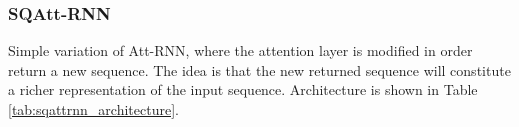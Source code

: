 \begin{table}[h!]
	\caption{Att-RNN architecture}
	\label{tab:attrnn_architecture}
\end{table}

\subsubsection{\textbf{SQAtt-RNN}}
Simple variation of Att-RNN, where the attention layer is modified in order return a new sequence. The idea is that the new returned sequence will constitute a richer representation of the input sequence. Architecture is shown in Table \ref{tab:sqattrnn_architecture}.

\begin{table}[h!]
		\caption{SQAtt-RNN architecture}
	\label{tab:sqattrnn_architecture}
\end{table}

